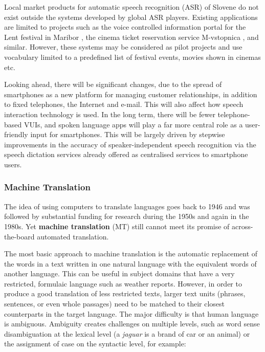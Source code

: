 \begin{multicols}{2}
Local market products for automatic speech recognition (ASR) of Slovene do not exist outside the systems developed by global ASR players. Existing applications are limited to projects such as the voice controlled information portal for the Lent festival in Maribor \cite{Lent1},  the cinema ticket reservation service M-vstopnica \cite{Kolosej1},  and similar. However, these systems may be considered as pilot projects and use vocabulary limited to a predefined list of festival events, movies shown in cinemas etc.

Looking ahead, there will be significant changes, due to the spread of smartphones as a new platform for managing customer relationships, in addition to fixed telephones, the Internet and e-mail. This will also affect how speech interaction technology is used. In the long term, there will be fewer telephone-based VUIs, and spoken language apps will play a far more central role as a user-friendly input for smartphones. This will be largely driven by stepwise improvements in the accuracy of speaker-independent speech recognition via the speech dictation services already offered as centralised services to smartphone users.

\subsubsection{Machine Translation}

The idea of using computers to translate languages goes back to 1946 and was followed by substantial funding for research during the 1950s and again in the 1980s. Yet \textbf{machine translation} (MT) still cannot meet its promise of across-the-board automated translation. 


The most basic approach to machine translation is the automatic replacement of the words in a text written in one natural language with the equivalent words of another language. This can be useful in subject domains that have a very restricted, formulaic language such as weather reports.  However, in order to produce a good translation of less restricted texts, larger text units (phrases, sentences, or even whole passages) need to be matched to their closest counterparts in the target language. The major difficulty is that human language is ambiguous. Ambiguity creates challenges on multiple levels, such as word sense disambiguation at the lexical level (a \textit{jaguar} is a brand of car or an animal) or the assignment of case on the syntactic level, for example:


\end{multicols}
